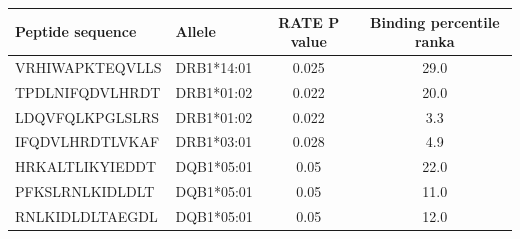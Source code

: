 \begin{tabular}{llcc}
\toprule
Peptide sequence & Allele & RATE P value & Binding percentile ranka \\
\midrule
VRHIWAPKTEQVLLS & DRB1*14:01 & 0.025 & 29.0 \\
TPDLNIFQDVLHRDT & DRB1*01:02 & 0.022 & 20.0 \\
LDQVFQLKPGLSLRS & DRB1*01:02 & 0.022 & 3.3 \\
IFQDVLHRDTLVKAF & DRB1*03:01 & 0.028 & 4.9 \\
HRKALTLIKYIEDDT & DQB1*05:01 & 0.05 & 22.0 \\
PFKSLRNLKIDLDLT & DQB1*05:01 & 0.05 & 11.0 \\
RNLKIDLDLTAEGDL & DQB1*05:01 & 0.05 & 12.0 \\
\bottomrule
\end{tabular}
